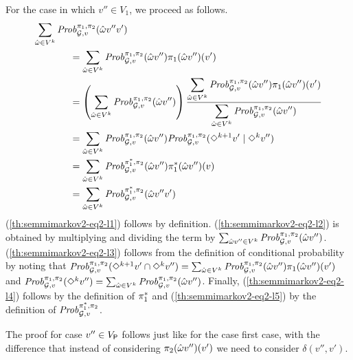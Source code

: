 \begin{myproof}
  For the case in which $v'' \in V_1$, we proceed as follows.
  \begin{align}	
    \sum_{\hat{\omega} \in V^k}\Prob{\strat{1}}{\strat{2}}_{\StochG,v}(\hat{\omega}v''v') \hspace{-6em} & \notag\\
    \label{th:semmimarkov2-eq2-l1}
    & = \sum_{\hat{\omega} \in V^k}\Prob{\strat{1}}{\strat{2}}_{\StochG,v}(\hat{\omega}v'') \strat{1}(\hat{\omega}v'')(v')\\
    \label{th:semmimarkov2-eq2-l2}
    & = \left( \sum_{\hat{\omega} \in V^k}\Prob{\strat{1}}{\strat{2}}_{\StochG,v}(\hat{\omega}v'') \right) \frac{\displaystyle\sum_{\hat{\omega} \in V^k}\Prob{\strat{1}}{\strat{2}}_{\StochG,v}(\hat{\omega}v'') \strat{1}(\hat{\omega}v'')(v')}{\displaystyle\sum_{\hat{\omega} \in V^k}\Prob{\strat{1}}{\strat{2}}_{\StochG,v}(\hat{\omega}v'')} \\
    \label{th:semmimarkov2-eq2-l3}
    & = \sum_{\hat{\omega} \in V^k}\Prob{\strat{1}}{\strat{2}}_{\StochG,v}(\hat{\omega}v'') \Prob{\strat{1}}{\strat{2}}_{\StochG,v}(\Diamond^{k+1} v' \mid \Diamond^k v'') \\
    \label{th:semmimarkov2-eq2-l4}
    & = \sum_{\hat{\omega} \in V^k}\Prob{\starredstrat{1}}{\strat{2}}_{\StochG,v}(\hat{\omega}v'') \starredstrat{1}(\hat{\omega}v'')(v)\\
    \label{th:semmimarkov2-eq2-l5}
    & = \sum_{\hat{\omega} \in V^k}\Prob{\starredstrat{1}}{\strat{2}}_{\StochG,v}(\hat{\omega}v''v')
  \end{align}
  (\ref{th:semmimarkov2-eq2-l1}) follows by definition.
  (\ref{th:semmimarkov2-eq2-l2}) is obtained by multiplying and
  dividing the term by
  $\sum_{\hat{\omega}v'' \in V^k}\mathit{Prob}^{\pi_{1}, \pi_{2}}_{\mathcal{G},v}(\hat{\omega}v'')$.
  (\ref{th:semmimarkov2-eq2-l3}) follows from the definition of
  conditional probability by noting that
  $\mathit{Prob}^{\pi_{1}, \pi_{2}}_{\mathcal{G},v}({\Diamond^{k+1} v'} \cap {\Diamond^k v''}) =
  \sum_{\hat{\omega} \in V^k}\mathit{Prob}^{\pi_{1}, \pi_{2}}_{\mathcal{G},v}(\hat{\omega}v'') \pi_{1}(\hat{\omega}v'')(v')$
  and 
  $\mathit{Prob}^{\pi_{1}, \pi_{2}}_{\mathcal{G},v}(\Diamond^{k} v'') =
  \sum_{\hat{\omega} \in V^k}\mathit{Prob}^{\pi_{1}, \pi_{2}}_{\mathcal{G},v}(\hat{\omega}v'')$.
  Finally, (\ref{th:semmimarkov2-eq2-l4}) follows by the definition of
  $\pi^*_{1}$ and (\ref{th:semmimarkov2-eq2-l5}) by the
  definition of $\mathit{Prob}^{\pi^*_{1}, \pi_{2}}_{\mathcal{G},v}$.

  The proof for case $v'' \in V_{\mathsf{P}}$ follows just like for
  the case first case, with the difference that instead of considering
  $\pi_{2}(\hat{\omega}v'')(v')$ we need to consider
  $\delta(v'',v')$.




\end{myproof}
